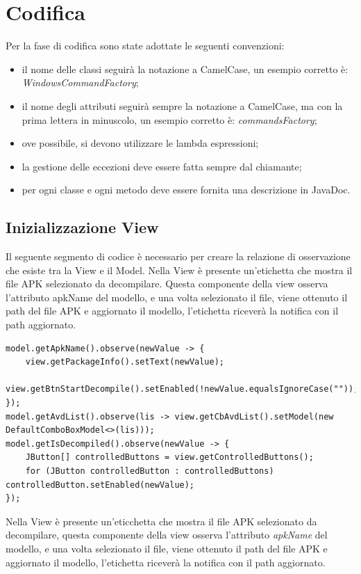\newpage
\section{Codifica}\label{sec:codifica}
Per la fase di codifica sono state adottate le seguenti convenzioni:
\begin{itemize}
    \item il nome delle classi seguirà la notazione a CamelCase, un esempio corretto è: \textit{WindowsCommandFactory};
    \item il nome degli attributi seguirà sempre la notazione a CamelCase, ma con la prima lettera in minuscolo, un esempio corretto è: \textit{commandsFactory};
    \item ove possibile, si devono utilizzare le lambda espressioni;
    \item la gestione delle eccezioni deve essere fatta sempre dal chiamante;
    \item per ogni classe e ogni metodo deve essere fornita una descrizione in JavaDoc.
\end{itemize}
\subsection{Inizializzazione View}\label{subsec:inizializzazione-view}
Il seguente segmento di codice è necessario per creare  la relazione di osservazione che esiste tra la View e il Model.
Nella View è presente un’etichetta che mostra il file APK selezionato da decompilare.
Questa componente della view osserva l’attributo apkName del modello, e una volta selezionato il file, viene ottenuto il path del file APK e aggiornato il modello, l’etichetta riceverà la notifica con il path aggiornato.

\begin{lstlisting}[caption={Inizializzazione relazione di osservazione View e Model},label={lst:lstlisting}]
model.getApkName().observe(newValue -> {
    view.getPackageInfo().setText(newValue);
    view.getBtnStartDecompile().setEnabled(!newValue.equalsIgnoreCase(""));
});
model.getAvdList().observe(lis -> view.getCbAvdList().setModel(new DefaultComboBoxModel<>(lis)));
model.getIsDecompiled().observe(newValue -> {
    JButton[] controlledButtons = view.getControlledButtons();
    for (JButton controlledButton : controlledButtons) controlledButton.setEnabled(newValue);
});
\end{lstlisting}
Nella View è presente un'eticchetta che mostra il file APK selezionato da decompilare, questa componente della view osserva l'attributo \textit{apkName} del modello, e una volta selezionato il file, viene ottenuto il path del file APK e aggiornato il modello, l'etichetta riceverà la notifica con il path aggiornato.

